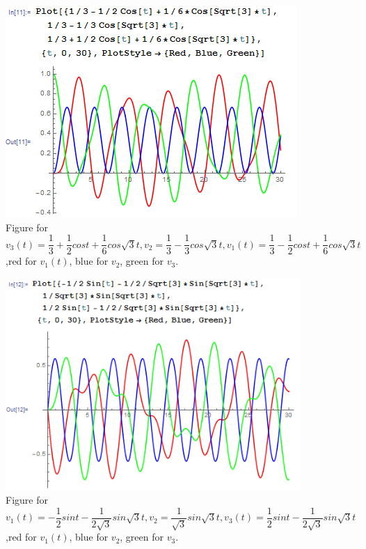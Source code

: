 \documentclass[a4paper,12pt,titlepage]{article}
\begin{document}
\begin{figure}[H]
    \centering
    \includegraphics[width=11
    cm]{53.png}
    \caption{Figure for $v_3
    (t)=\dfrac{1}{3}+\dfrac{1}{2}cost+\dfrac{1}{6}cos\sqrt{3}t,v_2=\dfrac{1}{3}-\dfrac{1}{3}cos\sqrt{3}t,v_1(t)=\dfrac{1}{3}-\dfrac{1}{2}cost+\dfrac{1}{6}cos\sqrt{3}t$,red for $v_1(t)$, blue for $v_2$, green for $v_3$.}
\end{figure}


\begin{figure}[H]
    \centering
    \includegraphics[width=11
    cm]{54.png}
    \caption{Figure for $v_1
    (t)=-\dfrac{1}{2}sint-\dfrac{1}{2\sqrt{3}}sin\sqrt{3}t,v_2=\dfrac{1}{\sqrt{3}}sin\sqrt{3}t,v_3(t)=\dfrac{1}{2}sint-\dfrac{1}{2\sqrt{3}}sin\sqrt{3}t$,red for $v_1(t)$, blue for $v_2$, green for $v_3$.}
\end{figure}
\end{document}
